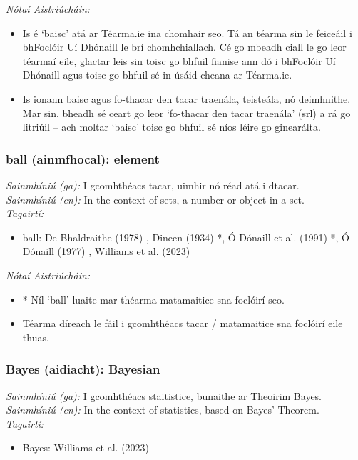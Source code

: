  \noindent \textit{Nótaí Aistriúcháin:}
\begin{itemize}
	\item Is é `baisc' atá ar Téarma.ie ina chomhair seo. Tá an téarma sin le feiceáil i bhFoclóir Uí Dhónaill le brí chomhchiallach. Cé go mbeadh ciall le go leor téarmaí eile, glactar leis sin toisc go bhfuil fianise ann dó i bhFoclóir Uí Dhónaill agus toisc go bhfuil sé in úsáid cheana ar Téarma.ie.
	\item Is ionann baisc agus fo-thacar den tacar traenála, teisteála, nó deimhnithe. Mar sin, bheadh sé ceart go leor `fo-thacar den tacar traenála' (srl) a rá go litriúil -- ach moltar `baisc' toisc go bhfuil sé níos léire go ginearálta.
\end{itemize}


\subsubsection*{ball (ainmfhocal): element}
 \noindent \textit{Sainmhíniú (ga):} I gcomhthéacs tacar, uimhir nó réad atá i dtacar.
\\
 \noindent \textit{Sainmhíniú (en):} In the context of sets, a number or object in a set.
\\
 \noindent \textit{Tagairtí:}
\begin{itemize}
	\item ball: De Bhaldraithe (1978) \cite{de-bhaldraithe}, Dineen (1934) \cite{dineen}*, Ó Dónaill et al. (1991) \cite{focloir-beag}*, Ó Dónaill (1977) \cite{odonaill}, Williams et al. (2023) \cite{storchiste}
\end{itemize}

 \noindent \textit{Nótaí Aistriúcháin:}
\begin{itemize}
	\item * Níl `ball' luaite mar théarma matamaitice sna foclóirí seo.
	\item Téarma díreach le fáil i gcomhthéacs tacar / matamaitice sna foclóirí eile thuas.
\end{itemize}


\subsubsection*{Bayes (aidiacht): Bayesian}
 \noindent \textit{Sainmhíniú (ga):} I gcomhthéacs staitistice, bunaithe ar Theoirim Bayes.
\\
 \noindent \textit{Sainmhíniú (en):} In the context of statistics, based on Bayes' Theorem.
\\
 \noindent \textit{Tagairtí:}
\begin{itemize}
	\item Bayes: Williams et al. (2023) \cite{storchiste}
\end{itemize}

